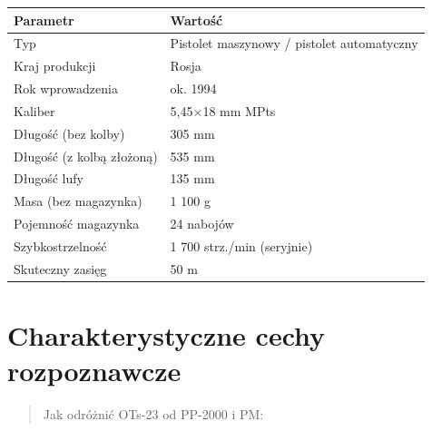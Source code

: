 \documentclass[12pt,openany,oneside]{book}
\begin{document}
\begin{longtable}[]{@{}ll@{}}
\toprule\noalign{}
Parametr & Wartość \\
\midrule\noalign{}
\endhead
\bottomrule\noalign{}
\endlastfoot
Typ & Pistolet maszynowy / pistolet automatyczny \\
Kraj produkcji & Rosja \\
Rok wprowadzenia & ok. 1994 \\
Kaliber & 5,45×18 mm MPts \\
Długość (bez kolby) & 305 mm \\
Długość (z kolbą złożoną) & 535 mm \\
Długość lufy & 135 mm \\
Masa (bez magazynka) & 1 100 g \\
Pojemność magazynka & 24 nabojów \\
Szybkostrzelność & 1 700 strz./min (seryjnie) \\
Skuteczny zasięg & 50 m \\
\end{longtable}

\section{Charakterystyczne cechy
rozpoznawcze}\label{charakterystyczne-cechy-rozpoznawcze-95}

\begin{quote}
Jak odróżnić OTs-23 od PP-2000 i PM:
\end{quote}
\end{document}
